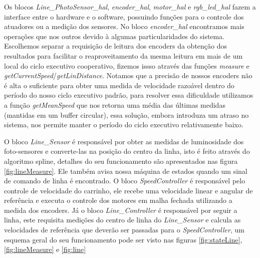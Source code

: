 \documentclass{article}
\begin{document}
Os blocos \textit{Line\_PhotoSensor\_hal}, \textit{encoder\_hal}, \textit{motor\_hal} e \textit{rgb\_led\_hal} fazem a interface entre o hardware e o software, possuindo funções para o controle dos atuadores ou a medição dos sensores. No bloco \textit{encoder\_hal} encontramos mais operações que nos outros devido à algumas particularidades do sistema. Escolhemos separar a requisição de leitura dos encoders da obtenção dos resultados para facilitar o reaproveitamento da mesma leitura em mais de um local do ciclo executivo cooperativo, fizemos issso através das funções \textit{measure} e \textit{getCurrentSpeed}/\textit{getLinDistance}. Notamos que a precisão de nossos encoders não é alta o suficiente para obter uma medida de velocidade razoável dentro do período do nosso ciclo executivo padrão, para resolver essa dificuldade utilizamos a função \textit{getMeanSpeed} que nos retorna uma média das últimas medidas (mantidas em um buffer circular), essa solução, embora introduza um atraso no sistema, nos permite manter o período do ciclo executivo relativamente baixo.

O bloco \textit{Line\_Sensor} é responsável por obter as medidas de luminosidade dos foto-sensores e converte-las na posição do centro da linha, isto é feito através do algoritmo spline, detalhes do seu funcionamento são apresentados nas figura \ref{fig:lineMeasure}. Ele também avisa nossa máquina de estados quando um sinal de comando de linha é encontrado. O bloco \textit{SpeedController} é responsável pelo controle de velocidade do carrinho, ele recebe uma velocidade linear e angular de referência e executa o controle dos motores em malha fechada utilizando a medida dos encoders. Já o bloco \textit{Line\_Controller} é responsável por seguir a linha, este requisita medições do centro de linha do \textit{Line\_Sensor} e calcula as velocidades de referência que deverão ser passadas para o \textit{SpeedController}, um esquema geral do seu funcionamento pode ser visto nas figuras \ref{fig:stateLine}, \ref{fig:lineMeasure} e \ref{fig:line}
\end{document}
